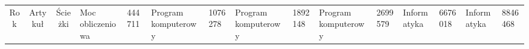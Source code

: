 \begin{tabular}{|c|c|c|}
	\hline
	Rok &	Artykuł &	Ścieżki  &	Moc obliczeniowa &	444711  &	Program komputerowy &	1076278  &	Program komputerowy &	1892148  &	Program komputerowy &	2699579  &	Informatyka &	6676018  &	Informatyka &	8846468 \nl
\end{tabular}